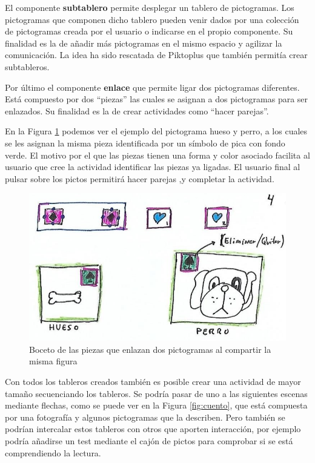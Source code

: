 El componente \textbf{subtablero} permite desplegar un tablero de pictogramas. Los pictogramas que componen dicho tablero pueden venir dados por una colección de pictogramas creada por el usuario o indicarse en el propio componente. Su finalidad es la de añadir más pictogramas en el mismo espacio y agilizar la comunicación. La idea ha sido rescatada de Piktoplus que también permitía crear subtableros.


Por último el componente \textbf{enlace} que permite ligar dos pictogramas diferentes. Está compuesto por dos “piezas” las cuales se asignan a dos pictogramas para ser enlazados. Su finalidad es la de crear actividades como “hacer parejas”.

En la Figura \ref{fig:componenteenla} podemos ver el ejemplo del pictograma hueso y perro, a los cuales se les asignan la misma pieza identificada por un símbolo de pica con fondo verde. El motivo por el que  las piezas tienen una forma y color asociado facilita al usuario que cree la actividad identificar las piezas ya  ligadas. El usuario final al pulsar sobre los pictos permitirá hacer parejas ,y completar la actividad.

\begin{figure}[h!]
	\centering
	\includegraphics[width=0.7\linewidth]{Imagenes/Bitmap/componenteEnla}
	\caption{Boceto de las piezas que enlazan dos pictogramas al compartir la misma figura}
	\label{fig:componenteenla}
\end{figure}



Con todos los tableros creados también es posible crear una actividad de mayor tamaño secuenciando los tableros. Se podría pasar de uno a las siguientes escenas mediante flechas, como se puede ver en la Figura \ref{fig:cuento}, que está compuesta por una fotografía y algunos pictogramas que la describen. Pero también se podrían intercalar estos tableros con otros que aporten interacción, por ejemplo podría añadirse un test mediante el cajón de pictos para comprobar si se está comprendiendo la lectura.

